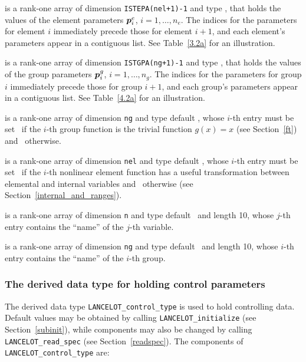 \documentclass{galahad}
\newcommand{\fullpackagename}{LANC\-E\-LOT}
\begin{document}
\begin{description}
 is a rank-one array of dimension {\tt ISTEPA(nel+1)-1}
and type \realdp, that holds
the values of the element parameters ${\bm{p}}^e_i$, $i = 1, \ldots,
n_e$. The indices for the parameters for element $i$ immediately precede
those for element $i+1$, and each element's parameters appear in a contiguous
list. See Table~\ref{3.2a} for an illustration.

 is a rank-one array of dimension {\tt ISTGPA(ng+1)-1}
and type \realdp, that holds
the values of the group parameters ${\bm{p}}^g_i$, $i = 1, \ldots,
n_g$. The indices for the parameters for group $i$ immediately precede
those for group $i+1$, and each group's parameters appear in a contiguous
list. See Table~\ref{4.2a} for an illustration.

 is a rank-one array of dimension {\tt ng} and type
default \logical, whose $i$-th entry must be
set \true\ if the $i$-th group function is the trivial function
$g(x)=x$ (see Section~\ref{ft}) and \false\ otherwise.

 is a rank-one array of dimension {\tt nel} and type
default \logical, whose $i$-th entry must be
set \true\ if the $i$-th nonlinear element function has a useful
transformation between elemental and internal variables
and \false\ otherwise (see Section~\ref{internal_and_ranges}).

 is a rank-one array of dimension {\tt n} and type
default \character\ and length 10, whose $j$-th entry contains the
``name'' of the $j$-th variable.

 is a rank-one array of dimension {\tt ng} and type
default \character\ and length 10, whose $i$-th entry contains the
``name'' of the $i$-th group.

\end{description}


\subsubsection{The derived data type for holding control
 parameters}\label{typecontrol}
The derived data type
{\tt \fullpackagename\_control\_type}
is used to hold controlling data. Default values may be obtained by calling
{\tt \fullpackagename\_initialize}
(see Section~\ref{subinit}),
while components may also be changed by calling
{\tt \fullpackagename\_read\-\_spec}
(see Section~\ref{readspec}).
The components of
{\tt \fullpackagename\_control\_type}
are:
\end{document}
